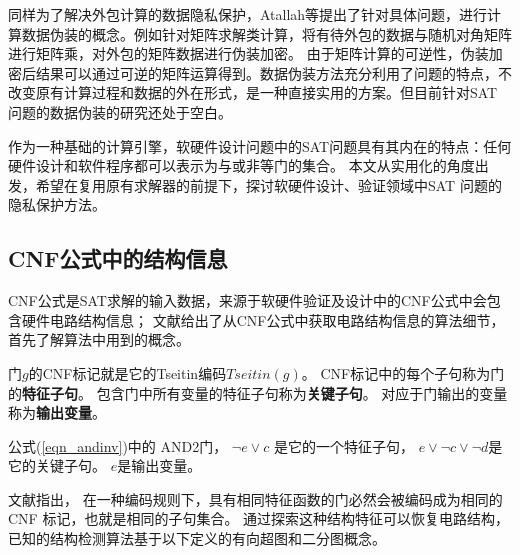 同样为了解决外包计算的数据隐私保护，Atallah等提出了针对具体问题，进行计算数据伪装的概念。例如针对矩阵求解类计算，将有待外包的数据与随机对角矩阵进行矩阵乘，对外包的矩阵数据进行伪装加密。
由于矩阵计算的可逆性，伪装加密后结果可以通过可逆的矩阵运算得到。数据伪装方法充分利用了问题的特点，不改变原有计算过程和数据的外在形式，是一种直接实用的方案。但目前针对SAT 问题的数据伪装的研究还处于空白。

作为一种基础的计算引擎，软硬件设计问题中的SAT问题具有其内在的特点：任何硬件设计和软件程序都可以表示为与或非等门的集合。
本文从实用化的角度出发，希望在复用原有求解器的前提下，探讨软硬件设计、验证领域中SAT 问题的隐私保护方法。

\subsection{CNF公式中的结构信息}\label{CNF structure}
CNF公式是SAT求解的输入数据，来源于软硬件验证及设计中的CNF公式中会包含硬件电路结构信息；
文献给出了从CNF公式中获取电路结构信息的算法细节，首先了解算法中用到的概念。
%
\begin{definition}[CNF标记]
门$g$的CNF标记就是它的Tseitin编码$Tseitin(g)$。
CNF标记中的每个子句称为门的\textbf{特征子句}。
包含门中所有变量的特征子句称为\textbf{关键子句}。
对应于门输出的变量称为\textbf{输出变量}。
\end{definition}

公式(\ref{eqn_andinv})中的 AND2门，
$\neg e\vee c$ 是它的一个特征子句，
$e\vee \neg c\vee\neg d$是它的关键子句。
$e$是输出变量。

文献指出，
在一种编码规则下，具有相同特征函数的门必然会被编码成为相同的CNF 标记，也就是相同的子句集合。
通过探索这种结构特征可以恢复电路结构，已知的结构检测算法基于以下定义的有向超图和二分图概念。

